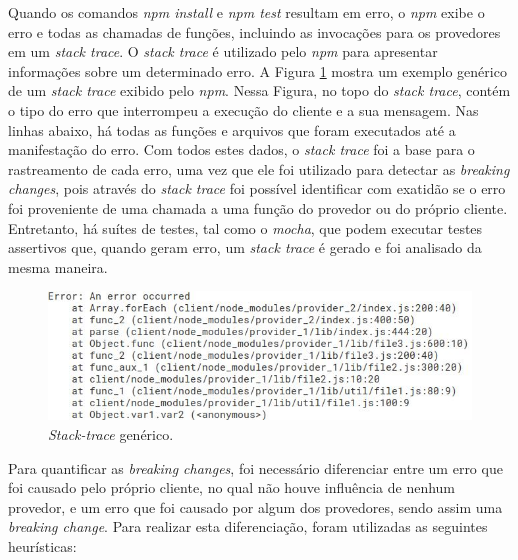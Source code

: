 Quando os comandos \textit{npm install} e \textit{npm test} resultam em erro, o \textit{npm} exibe o erro e todas as chamadas de funções, incluindo as invocações para os provedores em um \textit{stack trace}. O \textit{stack trace} é utilizado pelo \textit{npm} para apresentar informações sobre um determinado erro. A Figura \ref{fig:trace} mostra um exemplo genérico de um \textit{stack trace} exibido pelo \textit{npm}. Nessa Figura, no topo do \textit{stack trace}, contém o tipo do erro que interrompeu a execução do cliente e a sua mensagem. Nas linhas abaixo, há todas as funções e arquivos que foram executados até a manifestação do erro. Com todos estes dados, o \textit{stack trace} foi a base para o rastreamento de cada erro, uma vez que ele foi utilizado para detectar as \textit{breaking changes}, pois através do \textit{stack trace} foi possível identificar com exatidão se o erro foi proveniente de uma chamada a uma função do provedor ou do próprio cliente. Entretanto, há suítes de testes, tal como o \textit{mocha}, que podem executar testes assertivos que, quando geram erro, um \textit{stack trace} é gerado e foi analisado da mesma maneira.

\begin{figure}
    \centering
    \includegraphics[scale=0.7]{figuras/stack_trace.jpeg}
    \caption{\textit{Stack-trace} genérico.}
    \label{fig:trace}
\end{figure}{}

Para quantificar as \textit{breaking changes}, foi necessário diferenciar entre um erro que foi causado pelo próprio cliente, no qual não houve influência de nenhum provedor, e um erro que foi causado por algum dos provedores, sendo assim uma \textit{breaking change}. Para realizar esta diferenciação, foram utilizadas as seguintes heurísticas:

